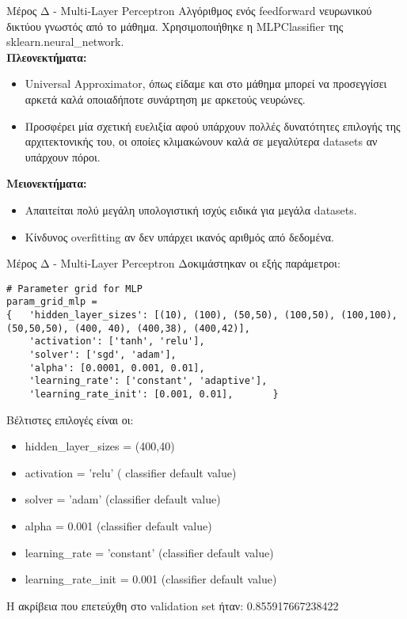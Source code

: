 \documentclass{beamer}
\begin{document}
\begin{frame}[fragile]{Μέρος Δ - Multi-Layer Perceptron}
Αλγόριθμος ενός feedforward νευρωνικού δικτύου γνωστός από το μάθημα. Χρησιμοποιήθηκε η MLPClassifier της sklearn.neural\_network. \\
\textbf{Πλεονεκτήματα:}
\begin{itemize}
    \item Universal Approximator, όπως είδαμε και στο μάθημα μπορεί να προσεγγίσει αρκετά καλά οποιαδήποτε συνάρτηση με αρκετούς νευρώνες.
    \item Προσφέρει μία σχετική ευελιξία αφού υπάρχουν πολλές δυνατότητες επιλογής της αρχιτεκτονικής του, οι οποίες κλιμακώνουν καλά σε μεγαλύτερα datasets αν υπάρχουν πόροι. 
\end{itemize}
\textbf{Μειονεκτήματα:}
\begin{itemize}
    \item Απαιτείται πολύ μεγάλη υπολογιστική ισχύς ειδικά για μεγάλα datasets.
    \item Κίνδυνος overfitting αν δεν υπάρχει ικανός αριθμός από δεδομένα.
\end{itemize}
\end{frame}
\begin{frame}[fragile]{Μέρος Δ -  Multi-Layer Perceptron}
\vspace{-0.3cm}
Δοκιμάστηκαν οι εξής παράμετροι:
\lstset{style=python}
\begin{lstlisting}
# Parameter grid for MLP
param_grid_mlp = 
{   'hidden_layer_sizes': [(10), (100), (50,50), (100,50), (100,100), (50,50,50), (400, 40), (400,38), (400,42)],
    'activation': ['tanh', 'relu'],         
    'solver': ['sgd', 'adam'],                   
    'alpha': [0.0001, 0.001, 0.01],                    
    'learning_rate': ['constant', 'adaptive'],        
    'learning_rate_init': [0.001, 0.01],       }
\end{lstlisting}

Βέλτιστες επιλογές είναι οι:
\begin{itemize}
    \item hidden\_layer\_sizes = (400,40)
    \item activation = 'relu' ( classifier default value)
   \item solver = 'adam' (classifier default value)
    \item alpha = 0.001 (classifier default value)
    \item learning\_rate = 'constant' (classifier default value)
    \item learning\_rate\_init = 0.001 (classifier default value)
\end{itemize}
Η ακρίβεια που επετεύχθη στο validation set ήταν: 0.855917667238422
\end{frame}
\end{document}
